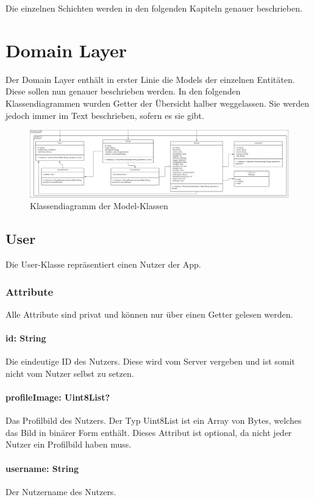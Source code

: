 \documentclass[parskip=full]{scrartcl}
\begin{document}
Die einzelnen Schichten werden in den folgenden Kapiteln genauer beschrieben.
\newpage

\section{Domain Layer}
Der Domain Layer enthält in erster Linie die Models der einzelnen Entitäten. Diese sollen nun genauer beschrieben werden. In den folgenden Klassendiagrammen wurden Getter der Übersicht halber weggelassen. Sie werden jedoch immer im Text beschrieben, sofern es sie gibt.
\begin{figure}[htp]
    \centering
    \includegraphics[width = \textwidth]{images/domainLayer/domainLayer.pdf}
    \caption{Klassendiagramm der Model-Klassen}
    \label{fig:domain-layer}
\end{figure}
\newpage
\subsection{User}
Die User-Klasse repräsentiert einen Nutzer der App.
\subsubsection*{Attribute}
Alle Attribute sind privat und können nur über einen Getter gelesen werden.
\paragraph{id: String}
Die eindeutige ID des Nutzers. Diese wird vom Server vergeben und ist somit nicht vom Nutzer selbst zu setzen.
\paragraph{profileImage: Uint8List?}
Das Profilbild des Nutzers. Der Typ Uint8List ist ein Array von Bytes, welches das Bild in binärer Form enthält. Dieses Attribut ist optional, da nicht jeder Nutzer ein Profilbild haben muss.
\paragraph{username: String}
Der Nutzername des Nutzers.
\end{document}
